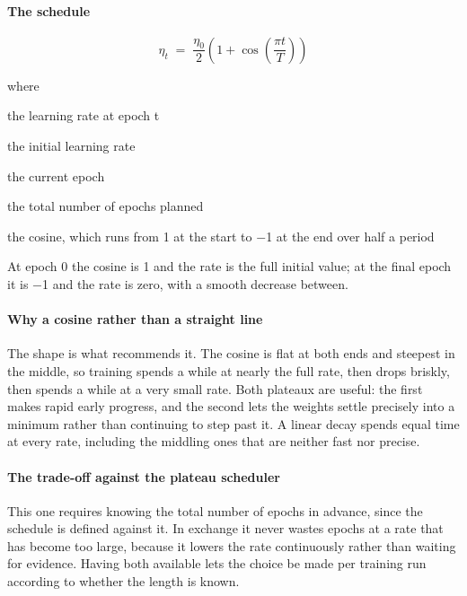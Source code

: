 \paragraph{The schedule}

\begin{equation}
\eta_t \;=\; \frac{\eta_0}{2}\left(1 + \cos\!\left(\frac{\pi t}{T}\right)\right)
\end{equation}

\noindent where
\begin{description}[leftmargin=2.4em,style=nextline,font=\normalfont\ttfamily]\setlength\itemsep{1pt}
  \item[{$\eta_t$}] \normalfont the learning rate at epoch t
  \item[{$\eta_0$}] \normalfont the initial learning rate
  \item[{$t$}] \normalfont the current epoch
  \item[{$T$}] \normalfont the total number of epochs planned
  \item[{$\cos$}] \normalfont the cosine, which runs from 1 at the start to $-$1 at the end over half a period
\end{description}
At epoch 0 the cosine is 1 and the rate is the full initial value; at the final epoch it is $-$1 and the rate is zero, with a smooth decrease between.


\paragraph{Why a cosine rather than a straight line}
The shape is what recommends it. The cosine is flat at both ends and steepest in the middle, so training spends a while at nearly the full rate, then drops briskly, then spends a while at a very small rate. Both plateaux are useful: the first makes rapid early progress, and the second lets the weights settle precisely into a minimum rather than continuing to step past it. A linear decay spends equal time at every rate, including the middling ones that are neither fast nor precise.


\paragraph{The trade-off against the plateau scheduler}
This one requires knowing the total number of epochs in advance, since the schedule is defined against it. In exchange it never wastes epochs at a rate that has become too large, because it lowers the rate continuously rather than waiting for evidence. Having both available lets the choice be made per training run according to whether the length is known.


